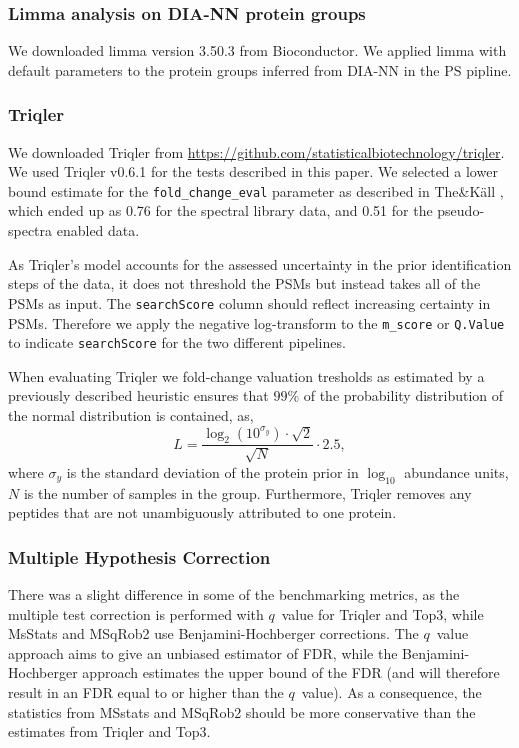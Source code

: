 \documentclass[10pt,letterpaper]{article}
\begin{document}
\subsubsection*{Limma analysis on DIA-NN protein groups}

We downloaded limma\cite{limma} version 3.50.3 from Bioconductor. We applied limma with default parameters to the protein groups inferred from DIA-NN in the PS pipline.  


\subsubsection*{Triqler}

We downloaded Triqler from \url{https://github.com/statisticalbiotechnology/triqler}. We used Triqler v0.6.1 for the tests described in this paper. We selected a lower bound estimate for the \texttt{fold\_change\_eval} parameter as described in The\&K\"{a}ll \cite{the2021triqler}, which ended up as 0.76 for the spectral library data, and 0.51 for the pseudo-spectra enabled data.

As Triqler's model accounts for the assessed uncertainty in the prior identification steps of the data, it does not threshold the PSMs but instead takes all of the PSMs as input. The \texttt{searchScore} column should reflect increasing certainty in PSMs. Therefore we apply the negative log-transform to the \texttt{m\_score} or \texttt{Q.Value} to indicate \texttt{searchScore} for the two different pipelines. 

When evaluating Triqler we fold-change valuation tresholds as estimated by a previously described heuristic ensures that $99\%$ of the 
probability distribution of the normal distribution is contained, as,
\begin{equation}
 L = \frac{\log_2 \left( 10^{\sigma_y} \right) \cdot \sqrt{2}}{\sqrt{N}} \cdot 
2.5,
\end{equation}
where $\sigma_y$ is the standard deviation of the protein prior in $\log_{10}$ 
abundance units, $N$ is the number of samples in the group. Furthermore, Triqler removes any peptides that are not unambiguously attributed to one protein.

\subsubsection*{Multiple Hypothesis Correction}
There was a slight difference in some of the benchmarking metrics, as the multiple test correction is performed with $q$~value for Triqler and Top3, while MsStats and MSqRob2 use Benjamini-Hochberger \cite{benjamini1995controlling} corrections. The $q$~value approach aims to give an unbiased estimator of FDR, while the Benjamini-Hochberger approach estimates the upper bound of the FDR (and will therefore result in an FDR equal to or higher than the $q$~value). As a consequence, the statistics from MSstats and MSqRob2 should be more conservative than the estimates from Triqler and Top3\cite{korthauer2019practical}.
\end{document}
